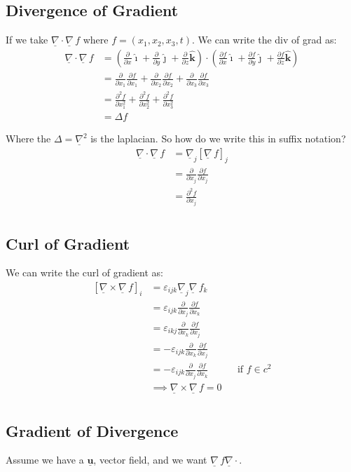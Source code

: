 \documentclass{article}
\renewcommand{\vec}[1]{\underline{\textbf{#1}}}
\newcommand{\veci}{\bm{\hat{\imath}}}
\newcommand{\vecj}{\bm{\hat{\jmath}}}
\newcommand{\veck}{\bm{\hat{k}}}
\newcommand{\e}{\varepsilon}
\newcommand{\nab}{\underline{\nabla}}
\newcommand{\grad}{{\nab}\, f}
\newcommand{\pd}[2]{\frac{\partial #1}{\partial #2}}
\renewcommand{\div}{\nab \cdot}
\newcommand{\curl}{\nab \times}
\begin{document}
\subsection{Divergence of Gradient}%

If we take $\nab \cdot \grad$ where $f = (x_1, x_2, x_3, t)$. We can write the div of grad as:
\begin{align*}
  \div \grad &= \left(\pd{}{x}\veci + \pd{}{y}\vecj + \pd{}{z}\veck \right) \cdot \left(\pd{f}{x}\veci + \pd{f}{y}\vecj + \pd{f}{z}\veck \right) \\
  &= \pd{}{x_1}\pd{f}{x_1} + \pd{}{x_2}\pd{f}{x_2} + \pd{}{x_3}\pd{f}{x_3}\\
  &= \pd{^2 f}{x_1^2} + \pd{^2 f}{x_2^2} + \pd{^2 f}{x_3^2}\\
  &= \Delta f
\end{align*}

Where the $\Delta = \nab ^2$ is the laplacian. So how do we write this in suffix notation?
\begin{align*}
  \div \grad &= \nab_j[\grad]_j\\
  &= \pd{}{x_j} \pd{f}{x_j}\\
  &= \pd{^2 f}{x_j}\\
\end{align*}

\subsection{Curl of Gradient}

We can write the curl of gradient as:
\begin{align*}
  \left[\curl \grad\right]_i &= \e_{ijk}\nab_j\grad_k\\
  &= \e_{ijk}\pd{}{x_j}\pd{f}{x_k}\\
  &= \e_{ikj}\pd{}{x_k}\pd{f}{x_j}\\
  &= - \e_{ijk}\pd{}{x_k}\pd{f}{x_j}\\
  &= - \e_{ijk}\pd{}{x_j}\pd{f}{x_k} && \text{if $f\in c^2$}\\
  &\implies \curl\grad = 0\\
\end{align*}

\subsection{Gradient of Divergence}
Assume we have a $\vec u$, vector field, and we want $\grad \div$.
\end{document}

